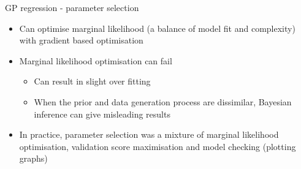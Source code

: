 \begin{frame}{GP regression - parameter selection}
  \begin{itemize}
    \item Can optimise marginal likelihood (a balance of model fit and complexity) with gradient based optimisation
    \vspace{\baselineskip}
    \item Marginal likelihood optimisation can fail
    \begin{itemize}
      \item Can result in slight over fitting
      \item When the prior and data generation process are dissimilar, Bayesian inference can give misleading results
    \end{itemize}
    \vspace{\baselineskip}
    \item In practice, parameter selection was a mixture of marginal likelihood optimisation, validation score maximisation and model checking (plotting graphs)
  \end{itemize}
\end{frame}


